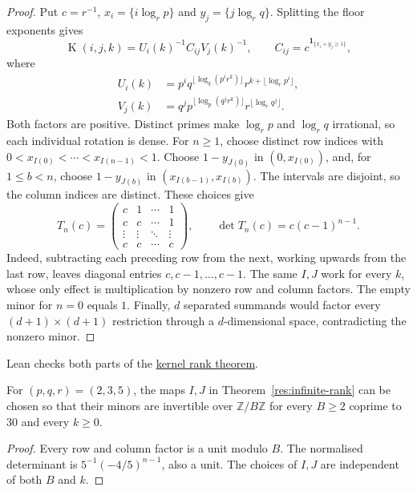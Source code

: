 \documentclass[11pt]{article}
\newcommand{\Kernel}{\operatorname{K}}
\begin{document}
\begin{proof}
Put $c=r^{-1}$, $x_i=\{i\log_r p\}$ and $y_j=\{j\log_r q\}$.
Splitting the floor exponents gives
\[
 \Kernel(i,j,k)=U_i(k)^{-1}C_{ij}V_j(k)^{-1},\qquad
 C_{ij}=c^{\mathbf1_{\{x_i+y_j\ge1\}}},
\]
where
\[
\begin{aligned}
 U_i(k)&=p^i q^{\lfloor\log_q(p^ir^k)\rfloor}
            r^{k+\lfloor\log_r p^i\rfloor},\\
 V_j(k)&=q^j p^{\lfloor\log_p(q^jr^k)\rfloor}
            r^{\lfloor\log_r q^j\rfloor}.
\end{aligned}
\]
Both factors are positive.  Distinct primes make $\log_r p$ and
$\log_r q$ irrational, so each individual rotation is dense.
For $n\ge1$, choose distinct row indices with
$0<x_{I(0)}<\cdots<x_{I(n-1)}<1$.
Choose $1-y_{J(0)}$ in $(0,x_{I(0)})$, and, for $1\le b<n$,
choose $1-y_{J(b)}$ in
$(x_{I(b-1)},x_{I(b)})$.  The intervals are disjoint, so the column
indices are distinct.  These choices give
\[
 T_n(c)=\begin{pmatrix}
 c&1&\cdots&1\\
 c&c&\cdots&1\\
 \vdots&\vdots&\ddots&\vdots\\
 c&c&\cdots&c
 \end{pmatrix},\qquad
 \det T_n(c)=c(c-1)^{n-1}.
\]
Indeed, subtracting each preceding row from the next, working upwards from
the last row, leaves diagonal entries $c,c-1,\ldots,c-1$.
The same $I,J$ work for every $k$, whose only effect is multiplication by
nonzero row and column factors.  The empty minor for $n=0$ equals $1$.
Finally, $d$ separated summands would factor every $(d+1)\times(d+1)$
restriction through a $d$-dimensional space, contradicting the nonzero minor.
\end{proof}

\noindent Lean checks both parts of the \href{https://github.com/wcook04/plectis-erdos/blob/f36a98bf3d3e6f65f1074e3b800e3293d5b8a51a/ErdosProblems/Erdos269/PaperR7BasicAssembly.lean#L22}{kernel rank theorem}.

\begin{corollary}
\label{res:admissible-modular-minors}
For $(p,q,r)=(2,3,5)$, the maps $I,J$ in
Theorem~\ref{res:infinite-rank} can be chosen so that their minors are
invertible over $\mathbb Z/B\mathbb Z$ for every $B\ge2$ coprime to $30$
and every $k\ge0$.
\end{corollary}
\begin{proof}
Every row and column factor is a unit modulo $B$.  The normalised determinant
is $5^{-1}(-4/5)^{n-1}$, also a unit.  The choices of $I,J$ are independent
of both $B$ and $k$.
\end{proof}
\end{document}
